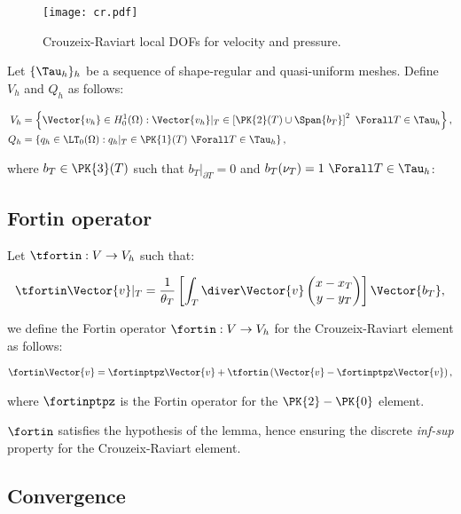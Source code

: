 \begin{figure}[!ht]
	\centering
	\texttt{[image: cr.pdf]}
	\caption{Crouzeix-Raviart local DOFs for velocity and pressure.}
\end{figure}

Let $\{\Tau_h\}_h$ be a sequence of shape-regular and quasi-uniform meshes. Define $V_h$ and $Q_h$ as follows:

\begin{align}
    V_h &= \left\{ \Vector{v_h} \in H^1_0(\Omega): \Vector{v_h} \vert_T \in \left[ \PK{2}(T) \cup \Span{b_T} \right]^2 ~ \Forall T \in \Tau_h \right\}, \\
    Q_h &= \left\{ q_h \in \LT_0(\Omega): q_h \vert_T \in \PK{1}(T) ~ \Forall T \in \Tau_h \right\},
\end{align}

where $b_T \in \PK{3}(T)$ such that $b_T \vert_{\partial T} = 0$ and $b_T(\nu_T) = 1 ~ \Forall T \in \Tau_h$:

\subsection{Fortin operator}

Let $\tfortin: V \rightarrow V_h$ such that:

\begin{gather}
    \tfortin \Vector{v} \vert_T = \frac{1}{\theta_T} \left[ \int_T \diver \Vector{v} \begin{pmatrix}
        x - x_T \\
        y - y_T
    \end{pmatrix} \right] \Vector{b_T},
\end{gather}

we define the Fortin operator $\fortin: V \rightarrow V_h$ for the Crouzeix-Raviart element as follows:

\begin{gather}
    \fortin \Vector{v} = \fortinptpz \Vector{v} + \tfortin \left( \Vector{v} - \fortinptpz \Vector{v}\right),
\end{gather}

where $\fortinptpz$ is the Fortin operator for the $\PK{2}-\PK{0}$ element.

$\fortin$ satisfies the hypothesis of the  lemma, hence ensuring the discrete \textit{inf-sup} property for the Crouzeix-Raviart element.

\newpage
\subsection{Convergence}

